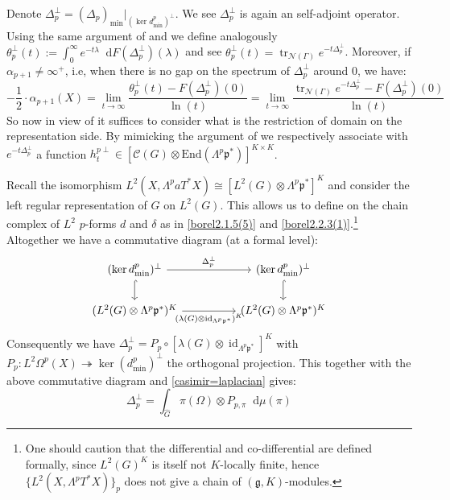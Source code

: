 \documentclass[11pt]{report}
\theoremstyle{definition}
\theoremstyle{plain}
\DeclareMathOperator{\tr}{tr}
\DeclareMathOperator{\id}{id}
\newcommand{\vna}{\mathcal{N}}
\renewcommand{\hat}{\widehat}
\newcommand{\mass}[1]{\mathop{}\mathrm{d}{#1}}
\newcommand{\Lie}[1]{\mathfrak{#1}}
\begin{document}
Denote $\Delta_p^\perp=(\Delta_p)_{\min}|_{(\ker d^p_{\min})^\perp}$. We see $\Delta_p^\perp$ is again an self-adjoint operator. Using the same argument of  and  we define analogously $\theta_p^\perp(t):=\int_{0}^\infty e^{-t\lambda}\mass{F(\Delta_p^\perp)(\lambda)}$ and see $\theta_p^\perp(t)=\tr_{\vna(\Gamma)}e^{-t\Delta_p^\perp}$. Moreover, if $\alpha_{p+1}\neq\infty^+$, i.e, when there is no gap on the spectrum of $\Delta^\perp_p$ around $0$, we have:
\begin{equation}\label{NS=trace}
-\frac{1}{2}\cdot\alpha_{p+1}(X)=\lim_{t\to \infty}\frac{\theta_p^\perp(t)-F(\Delta^\perp_p)(0)}{\ln(t)}=\lim_{t\to \infty}\frac{\tr_{\vna(\Gamma)}e^{-t\Delta_p^\perp}-F(\Delta^\perp_p)(0)}{\ln(t)}
\end{equation}
So now in view of  it suffices to consider what is the restriction of domain on the representation side. By mimicking the argument of  we respectively associate with $e^{-t\Delta_p^\perp}$ a function $h_t^{p\perp}\in [\mathcal{C}(G)\otimes \mathrm{End}(\Lambda^p\Lie{p}^*)]^{K\times K}$.
\par Recall the isomorphism $L^2(X, \Lambda^paT^*X)\cong [L^2(G)\otimes \Lambda^p\Lie{p}^*]^K$ and consider the left regular representation of $G$ on $L^2(G)$. This allows us to define on the chain complex of $L^2$ $p$-forms $d$ and $\delta$ as in \ref{borel2.1.5(5)} and \ref{borel2.2.3(1)}.\footnote{One should caution that the differential and co-differential are defined formally, since $L^2(G)^K$ is itself not $K$-locally finite, hence $\{L^2(X, \Lambda^pT^*X)\}_p$ does not give a chain of $(\Lie{g}, K)$-modules.} Altogether we have a commutative diagram (at a formal level):
\begin{equation}
\begin{tikzcd}[column sep=huge]
(\ker d^p_{\min})^\perp \arrow[r,"\Delta_p^\perp"] \arrow[d, hook] & (\ker d^p_{\min})^\perp \arrow[d, hook]\\
(L^2(G)\otimes \Lambda^p \mathfrak{p}^*)^K \arrow[r, swap, "(\lambda(G)\otimes \id_{\Lambda^p\Lie{p}^*})^K"] & (L^2(G)\otimes \Lambda^{p}\mathfrak{p}^*)^K 
\end{tikzcd}
\end{equation}
Consequently we have $\Delta_p^\perp=P_p\circ [\lambda(G)\otimes \id_{\Lambda^p\Lie{p}^*}]^K$ with $P_p:L^2\Omega^p(X)\twoheadrightarrow \ker(d^{p}_{\min})^\perp$ the orthogonal projection. This together with the above commutative diagram and \ref{casimir=laplacian} gives:
\begin{equation}
\Delta_p^\perp=\int_{\hat{G}}\pi(\Omega)\otimes P_{p,\pi}\mass{\mu(\pi)}
\end{equation}
\end{document}

